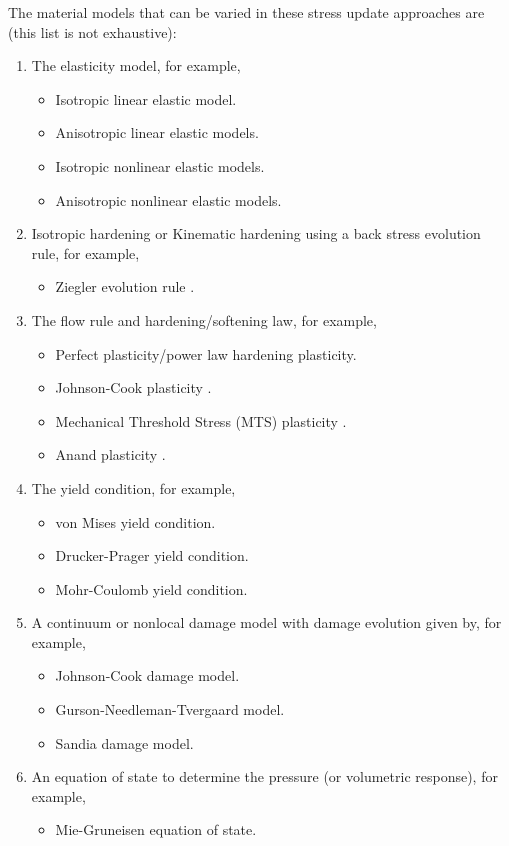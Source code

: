 The material models that can be varied in these stress update approaches
are (this list is not exhaustive):
\begin{enumerate}
    \item The elasticity model, for example,
      \begin{itemize}
        \item Isotropic linear elastic model.
        \item Anisotropic linear elastic models.
        \item Isotropic nonlinear elastic models.
        \item Anisotropic nonlinear elastic models.
      \end{itemize}
    \item Isotropic hardening or Kinematic hardening using a
          back stress evolution rule, for example,
      \begin{itemize}
        \item Ziegler evolution rule   .
      \end{itemize}
    \item The flow rule and hardening/softening law, for example,
      \begin{itemize}
        \item Perfect plasticity/power law hardening plasticity.
        \item Johnson-Cook plasticity .
        \item Mechanical Threshold Stress (MTS) plasticity .
        \item Anand plasticity .
      \end{itemize}
    \item The yield condition, for example,
      \begin{itemize}
        \item von Mises yield condition.
        \item Drucker-Prager yield condition.
        \item Mohr-Coulomb yield condition.
      \end{itemize}
    \item A continuum or nonlocal damage model with damage evolution
          given by, for example,
      \begin{itemize}
        \item Johnson-Cook damage model.
        \item Gurson-Needleman-Tvergaard model.
        \item Sandia damage model.
      \end{itemize}
    \item An equation of state to determine the pressure (or
          volumetric response), for example,
      \begin{itemize}
        \item Mie-Gruneisen equation of state.
      \end{itemize}
\end{enumerate}

